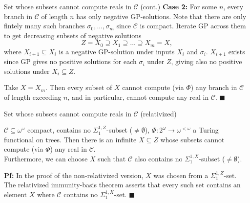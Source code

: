 \begin{frame}{Set whose subsets cannot compute reals in $\mathcal{C}$
(cont.)}
  \textbf{Case 2:} For some $n$, every branch in $\mathcal{C}$ of length
  $n$ has only negative GP-solutions. Note that there are only fintely many
  such branches $\sigma_0,\ldots,\sigma_m$ since $\mathcal{C}$ is compact.
  Iterate GP across them to get decreasing subsets of negative solutions
  \[Z=X_0 \supseteq X_1 \supseteq \ldots\supseteq X_m=X,\]
  where $X_{i+1}\subseteq X_i$ is a negative GP-solution under inputs
  $X_i$ and $\sigma_i$. $X_{i+1}$ exists since GP gives no positive
  solutions for each $\sigma_i$ under $Z$, giving also no positive
  solutions under $X_i\subseteq Z$.
  
  \vspace{1em}
  Take $X=X_m$. Then every subset of $X$ cannot compute (via $\Phi$) any
  branch in $\mathcal{C}$ of length exceeding $n$, and in particular,
  cannot compute any real in $\mathcal{C}$. $\blacksquare$
\end{frame}

\begin{frame}{Set whose subsets cannot compute reals in $\mathcal{C}$
(relativized)}
  \begin{main-lemma*}[Relativized]
    $\mathcal{C}\subseteq\omega^\omega$ compact, contains no
    $\Sigma_1^{1,Z}$-subset ($\neq\emptyset$),
    $\Phi:2^{\omega}\rightarrow \omega^{<\omega}$ a Turing functional on
    trees. Then there is an infinite $X\subseteq Z$ whose subsets cannot
    compute (via $\Phi$) any real in $\mathcal{C}$.\\
    \vspace{0.5em}
    Furthermore, we can choose $X$ such that $\mathcal{C}$ also contains no
    $\Sigma_1^{1,X}$-subset ($\neq\emptyset$).
  \end{main-lemma*}

  \vspace{1em}
  \textbf{Pf:} In the proof of the non-relativized version, $X$ was chosen
  from a $\Sigma_1^{1,Z}$-set. The relativized immunity-basis theorem
  asserts that every such set contains an element $X$ where $\mathcal{C}$
  contains no $\Sigma_1^{1,X}$-set. $\blacksquare$
\end{frame}

